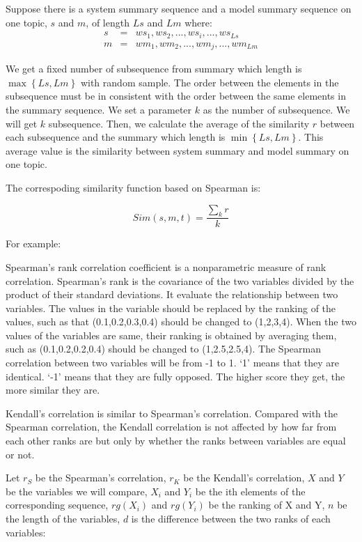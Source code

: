 Suppose there is a system summary sequence and a model summary sequence on one topic, 
$s$ and $m$, of length $Ls$ and $Lm$ where:
\begin{eqnarray*}
s &=& ws_{1}, ws_{2},...,ws_{i},...,ws_{Ls} \\
m &=& wm_{1}, wm_{2},...,wm_{j},...,wm_{Lm} 
\end{eqnarray*}

We get a fixed number of subsequence from summary which length is $\max \left\{Ls,Lm\right\}$ 
with random sample. The order between the elements in the subsequence must be 
in consistent with the order between the same elements in the summary sequence. 
We set a parameter $k$ as the number of subsequence. We will get $k$ subsequence. 
Then, we calculate the average of the similarity $r$ between each subsequence and the summary 
which length is $\min \left\{Ls,Lm\right\}$. This average value is the similarity between system summary
and model summary on one topic.

The correspoding similarity function based on Spearman is:

\begin{equation*}
Sim(s,m,t) = \frac {\sum_k r}{k}
\end{equation*}

For example:

Spearman's rank correlation coefficient is a nonparametric measure of rank correlation.
Spearman's rank is the covariance of the two variables divided by the product of 
their standard deviations. It evaluate the relationship between two variables. 
The values in the variable should be replaced by the ranking of the values,
such as that (0.1,0.2,0.3,0.4) should be changed to (1,2,3,4). When the two values 
of the variables are same, their ranking is obtained by averaging them, 
such as (0.1,0.2,0.2,0.4) should be changed to (1,2.5,2.5,4).
The Spearman correlation between two variables will be from -1 to 1. 
`1' means that they are identical. `-1' means that they are fully opposed. 
The higher score they get, the more similar they are.

Kendall's correlation is similar to Spearman's correlation. Compared with 
the Spearman correlation, the Kendall correlation is not affected by how far 
from each other ranks are but only by whether the ranks between variables are 
equal or not.

Let $r_{S}$ be the Spearman's correlation, $r_{K}$ be the Kendall's correlation, 
$X$ and $Y$ be the variables we will compare, $X_{i}$ and $Y_{i}$ be the ith elements
of the corresponding sequence, ${rg} (X_{i})$ and ${rg} (Y_{i})$ be the ranking of X and Y,
$n$ be the length of the variables, $d$ is the difference between the two ranks of each variables:

